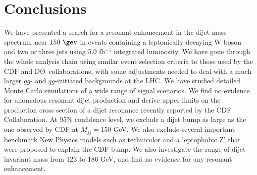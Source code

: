 \section{Conclusions}
\label{sec:conclusions}
We have presented a search for a resonant enhancement 
in the dijet mass spectrum near $150~\gev$ in events containing a 
leptonically decaying W boson and two or three jets using 5.0 fb${}^{-1}$ 
integrated luminosity.
We have gone through 
the whole analysis chain using 
similar event selection criteria to those used 
by the CDF and D\O\ collaborations,  
with some adjustments 
needed to deal with a much larger $gg$- and $qg$-initiated 
backgrounds at the LHC.  
We have studied detailed Monte Carlo simulations of a wide range 
of signal scenarios.
We find no evidence for anomalous resonant dijet production 
and derive upper limits on the production cross section of 
a dijet resonance recently reported by the CDF 
Collaboration.
At 95\% confidence level, we exclude a dijet bump 
as large as the one observed by CDF at $M_{jj} = 150$ GeV.
We also exclude several important benchmark New Physics models such as
technicolor and a leptophobic Z' that were proposed to explain the 
CDF bump.
We also investigate the range of dijet invariant mass from 
123 to 186 GeV, and find no evidence for any resonant enhancement.

